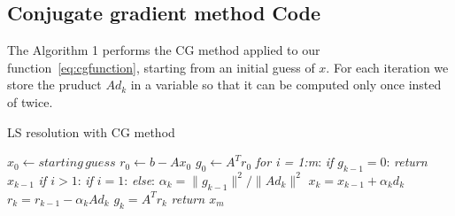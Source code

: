 \documentclass{article}
\begin{document}
\subsection{Conjugate gradient method Code}\label{subsec:conjugate-gradient-method-code}
The Algorithm 1 performs the CG method applied to our function~\ref{eq:cgfunction}, starting from an initial guess of $x$.
For each iteration we store the pruduct $Ad_k$ in a variable so that it can be computed only once insted of twice.
\makeatletter
\makeatother
\begin{algorithm}
\caption{LS resolution with CG method}
\begin{algorithmic}[1]
\State $x_0 \gets starting\,guess$
\State $r_0 \gets b -  Ax_0$
\State $g_0 \gets A^{T}r_0$ 
\State \emph{for i = 1:m}:
\State \quad\emph{if $g_{k-1} = 0$}:
\State\quad\quad\textit{return $x_{k-1}$}
\State \quad\emph{if $i > 1$}:
\State\quad{}
\State \quad\emph{if $i = 1$}: 
\State\quad{}
\State \quad\emph{else}: 
\State\quad{}
\State\quad $\alpha_{k} = \|g_{k-1}\|^2 / \|Ad_{k}\|^2$
\State\quad $x_{k} = x_{k-1} + \alpha_{k}d_{k}$
\State\quad $r_{k} = r_{k-1} - \alpha_{k}Ad_{k}$
\State\quad $g_{k} = A^{T}r_{k}$
\State\textit{return $x_{m}$}
\EndFunction
\end{algorithmic}
\end{algorithm}
\end{document}
